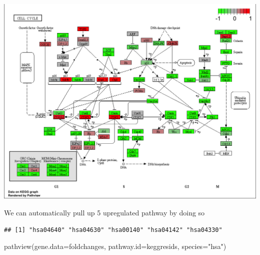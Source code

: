\documentclass[
]{article}
\newenvironment{Shaded}{\begin{snugshade}}{\end{snugshade}}
\newcommand{\AttributeTok}[1]{\textcolor[rgb]{0.77,0.63,0.00}{#1}}
\newcommand{\DecValTok}[1]{\textcolor[rgb]{0.00,0.00,0.81}{#1}}
\newcommand{\FunctionTok}[1]{\textcolor[rgb]{0.00,0.00,0.00}{#1}}
\newcommand{\NormalTok}[1]{#1}
\newcommand{\OtherTok}[1]{\textcolor[rgb]{0.56,0.35,0.01}{#1}}
\newcommand{\SpecialCharTok}[1]{\textcolor[rgb]{0.00,0.00,0.00}{#1}}
\newcommand{\StringTok}[1]{\textcolor[rgb]{0.31,0.60,0.02}{#1}}
\begin{document}
\includegraphics{hsa04110.pathview.png}

We can automatically pull up 5 upregulated pathway by doing so

\begin{Shaded}
\end{Shaded}

\begin{verbatim}
## [1] "hsa04640" "hsa04630" "hsa00140" "hsa04142" "hsa04330"
\end{verbatim}

\begin{Shaded}
\begin{Highlighting}[]
\FunctionTok{pathview}\NormalTok{(}\AttributeTok{gene.data=}\NormalTok{foldchanges, }\AttributeTok{pathway.id=}\NormalTok{keggresids, }\AttributeTok{species=}\StringTok{"hsa"}\NormalTok{)}
\end{Highlighting}
\end{Shaded}
\end{document}
